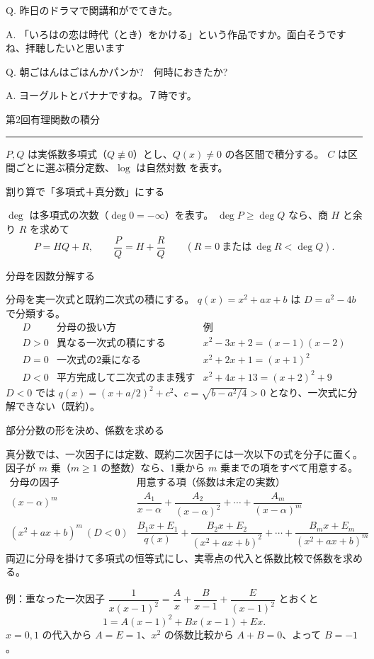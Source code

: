 \documentclass[a4paper,10pt,pdflatex,ja=standard,jafont=ipaex-type1,
  magstyle=real,scale=1]{bxjsarticle}
\newcommand{\coursename}{解析学 II}
\newcommand{\handoutnumber}{2}
\newcommand{\handouttitle}[1]{%
  \begin{center}
    {\Large\color{ink}#1}\par\vspace{3mm}
    {\color{accent}\rule{0.88\linewidth}{0.7pt}}
  \end{center}\vspace{-2mm}}
\newcommand{\handout}[2]{%
  \renewcommand{\handoutnumber}{#1}%
  \handouttitle{第#1回\quad #2}}
\newcommand{\topic}[1]{\par\vspace{5pt}%
  {\large\sffamily\mdseries\color{accent}#1}\par\vspace{2pt}}
\newcommand{\examplelabel}[1]{{\sffamily\mdseries\color{ink}#1}}
\newcommand{\feedback}[2]{%
  \par\addvspace{5pt}\noindent\begin{minipage}{\linewidth}%
  {\color{ink}Q. #1}\par\vspace{1pt}%
  {\color{accent}A. }#2%
  \end{minipage}\par}
\begin{document}
\feedback{昨日のドラマで関講和がでてきた。}{%
「いろはの恋は時代（とき）をかける」という作品ですか。面白そうですね、拝聴したいと思います}

\feedback{朝ごはんはごはんかパンか?　何時におきたか?}{%
ヨーグルトとバナナですね。７時です。}


\clearpage

\fancyhead[L]{\small\color{ink}\coursename{}・授業要約と演習}
\handout{2}{有理関数の積分}

$P,Q$ は実係数多項式（$Q\not\equiv0$）とし、$Q(x)\ne0$ の各区間で積分する。
$C$ は区間ごとに選ぶ積分定数、$\log$ は自然対数 を表す。

\topic{割り算で「多項式＋真分数」にする}
$\deg$ は多項式の次数（$\deg0=-\infty$）を表す。
$\deg P\ge\deg Q$ なら、商 $H$ と余り $R$ を求めて
$$
 P=HQ+R,\qquad \frac{P}{Q}=H+\frac{R}{Q}
 \qquad(R=0\ \text{または}\ \deg R<\deg Q).
$$


\topic{分母を因数分解する}
分母を実一次式と既約二次式の積にする。
$q(x)=x^2+ax+b$ は $D=a^2-4b$ で分類する。
$$
 \begin{array}{c|l|l}
 D & \text{分母の扱い方} & \text{例}\\ \hline
 D>0 & \text{異なる一次式の積にする} & x^2-3x+2=(x-1)(x-2)\\[2pt]
 D=0 & \text{一次式の2乗になる} & x^2+2x+1=(x+1)^2\\[2pt]
 D<0 & \text{平方完成して二次式のまま残す} & x^2+4x+13=(x+2)^2+9
 \end{array}
$$
$D<0$ では $q(x)=(x+a/2)^2+c^2$、$c=\sqrt{b-a^2/4}>0$ となり、一次式に分解できない（既約）。

\topic{部分分数の形を決め、係数を求める}
真分数では、一次因子には定数、既約二次因子には一次以下の式を分子に置く。
因子が $m$ 乗（$m\ge1$ の整数）なら、1乗から $m$ 乗までの項をすべて用意する。
$$
 \begin{array}{c|l}
 \text{分母の因子} & \text{用意する項（係数は未定の実数）}\\ \hline
 (x-\alpha)^m & \dfrac{A_1}{x-\alpha}+\dfrac{A_2}{(x-\alpha)^2}
   +\cdots+\dfrac{A_m}{(x-\alpha)^m}\\[7pt]
 (x^2+ax+b)^m\ (D<0) & \dfrac{B_1x+E_1}{q(x)}
   +\dfrac{B_2x+E_2}{(x^2+ax+b)^2}+\cdots+\dfrac{B_mx+E_m}{(x^2+ax+b)^m}
 \end{array}
$$
両辺に分母を掛けて多項式の恒等式にし、実零点の代入と係数比較で係数を求める。

\examplelabel{例：重なった一次因子}
$\dfrac1{x(x-1)^2}=\dfrac Ax+\dfrac B{x-1}+\dfrac E{(x-1)^2}$ とおくと
$$
 1=A(x-1)^2+Bx(x-1)+Ex.
$$
$x=0,1$ の代入から $A=E=1$、$x^2$ の係数比較から $A+B=0$、よって $B=-1$。
\end{document}
